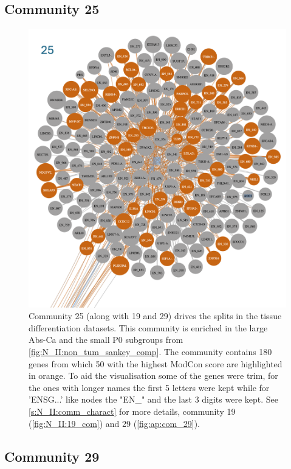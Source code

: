 \newpage

\subsection*{Community 25}

\begin{figure}[H]    
    \centering
    \includegraphics[width=1.0\textwidth,height=1.0\textheight,keepaspectratio]{Sections/Network_II/resources/non_tum/25_com.png}
    \caption{Community 25 (along with 19 and 29) drives the splits in the tissue differentiation datasets. This community is enriched in the large Abs-Ca and the small P0 subgroups from \cref{fig:N_II:non_tum_sankey_comp}. The community contains 180 genes from which 50 with the highest ModCon score are highlighted in orange. To aid the visualisation some of the genes were trim, for the ones with longer names the first 5 letters were kept while for 'ENSG...' like nodes the "EN\_" and the last 3 digits were kept. See \cref{s:N_II:comm_charact} for more details, community 19 (\cref{fig:N_II:19_com}) and 29 (\cref{fig:ap:com_29}). }
    \label{fig:ap:com_25}
\end{figure}



\subsection*{Community 29}

